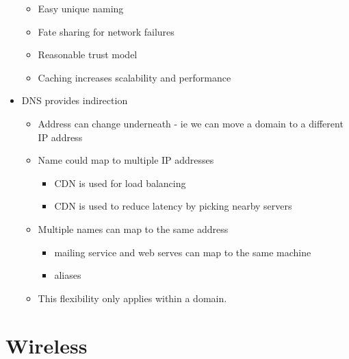 \begin{itemize}
  \begin{itemize}
  \tightlist
  \item
    Easy unique naming
  \item
    Fate sharing for network failures
  \item
    Reasonable trust model
  \item
    Caching increases scalability and performance
  \end{itemize}
\item
  DNS provides indirection

  \begin{itemize}
  \tightlist
  \item
    Address can change underneath - ie we can move a domain to a
    different IP address
  \item
    Name could map to multiple IP addresses

    \begin{itemize}
    \tightlist
    \item
      CDN is used for load balancing
    \item
      CDN is used to reduce latency by picking nearby servers
    \end{itemize}
  \item
    Multiple names can map to the same address

    \begin{itemize}
    \tightlist
    \item
      mailing service and web serves can map to the same machine
    \item
      aliases
    \end{itemize}
  \item
    This flexibility only applies within a domain.
  \end{itemize}
\end{itemize}

\hypertarget{wireless}{%
\section{Wireless}\label{wireless}}

